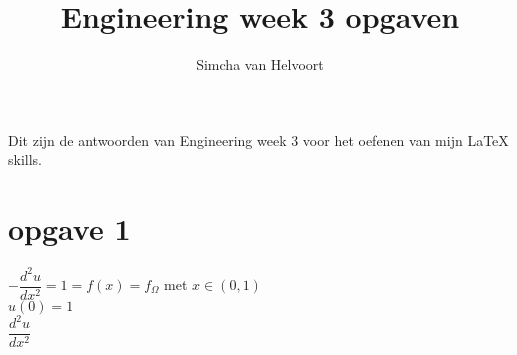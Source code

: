 \documentclass[11pt]{article}
\begin{document}
\title{Engineering week 3 opgaven}
\author{Simcha van Helvoort}
\maketitle{}
Dit zijn de antwoorden van Engineering week 3 voor het oefenen van mijn LaTeX skills.

\newpage

\section{opgave 1}

$-\dfrac{d^2u}{dx^2} = 1 = f(x) = f_{\Omega}$ met $x \in (0, 1)$ \\
$u(0) = 1$ \\
$\dfrac{d^2u}{dx^2}$
\end{document}
